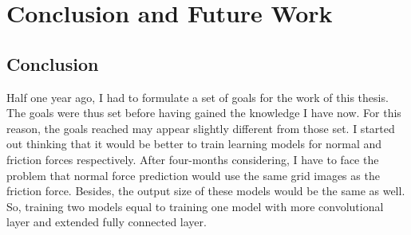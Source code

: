 \chapter{Conclusion and Future Work}

\section{Conclusion}
Half one year ago, I had to formulate a set of goals for the work of this thesis. The goals were thus set before having gained the knowledge I have now. For this reason, the goals reached may appear slightly different from those set. I started out thinking that it would be better to train learning models for normal and friction forces respectively. After four-months considering, I have to face the problem that normal force prediction would use the same grid images as the friction force. Besides, the output size of these models would be the same as well. So, training two models equal to training one model with more convolutional layer and extended fully connected layer. 
